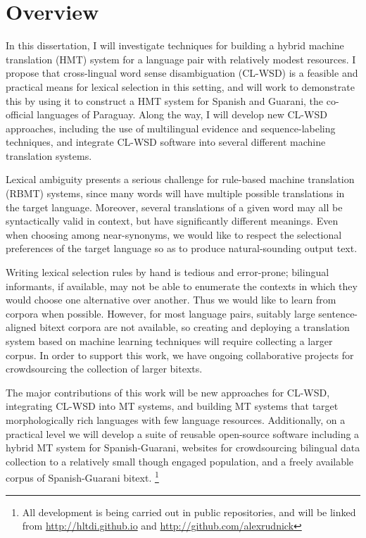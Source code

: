 \chapter{Overview}
In this dissertation, I will investigate techniques for building a hybrid
machine translation (HMT) system for a language pair with relatively modest
resources.
I propose that cross-lingual word sense disambiguation (CL-WSD) is a feasible
and practical means for lexical selection in this setting, and will work to
demonstrate this by using it to construct a HMT system for Spanish and Guarani,
the co-official languages of Paraguay.
Along the way, I will develop new CL-WSD approaches, including the use of
multilingual evidence and sequence-labeling techniques, and integrate
CL-WSD software into several different machine translation systems.

Lexical ambiguity presents a serious challenge for rule-based machine
translation (RBMT) systems, since many words will have multiple possible
translations in the target language. Moreover, several translations of a given
word may all be syntactically valid in context, but have significantly
different meanings. Even when choosing among near-synonyms, we would like to
respect the selectional preferences of the target language so as to produce
natural-sounding output text.

Writing lexical selection rules by hand is tedious and error-prone; bilingual
informants, if available, may not be able to enumerate the contexts in which
they would choose one alternative over another. Thus we would like to learn
from corpora when possible. However, for most language pairs, suitably large
sentence-aligned bitext corpora are not available, so creating and deploying a
translation system based on machine learning techniques will require collecting
a larger corpus. In order to support this work, we have ongoing collaborative
projects for crowdsourcing the collection of larger bitexts.

The major contributions of this work will be new approaches for CL-WSD,
integrating CL-WSD into MT systems, and building MT systems that target
morphologically rich languages with few language resources.  Additionally, on a
practical level we will develop a suite of reusable open-source software
including a hybrid MT system for Spanish-Guarani, websites for crowdsourcing
bilingual data collection to a relatively small though engaged population, and
a freely available corpus of Spanish-Guarani bitext.
\footnote{All development is being carried out in public repositories, and will
be linked from \url{http://hltdi.github.io} and
\url{http://github.com/alexrudnick}}

